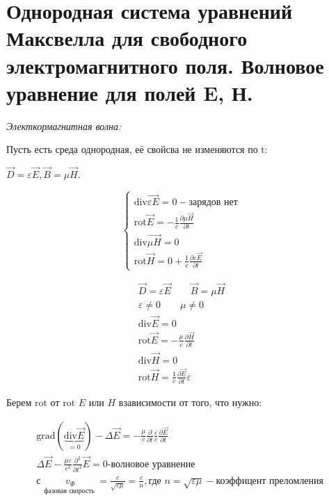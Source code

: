 \section{Однородная система уравнений Максвелла для свободного
электромагнитного поля. Волновое уравнение для полей E, Н.}

\textit{Электкормагнитная волна:}

Пусть есть среда однородная, её свойсва не изменяются по t: 

\( \vec{D}=\varepsilon\vec{E}, \vec{B}=\mu\vec{H} \).

\[
\begin{cases}
    \mathrm{div}\vec{\varepsilon E}=0 -\text{зарядов нет} \\
    \mathrm{rot}\vec{E}=-\frac{1}{c} \frac{\partial\mu\vec{H}}{\partial t} \\
    \mathrm{div}\vec{\mu H}=0 \\
    \mathrm{rot}\vec{H}=0+\frac{1}{c} \frac{\partial\varepsilon\vec{E}}{\partial t}  
\end{cases}
\]

\begin{gather*}
    \vec{D}=\varepsilon\vec{E} \qquad \vec{B}=\mu\vec{H} \\
    \varepsilon\neq0 \qquad \mu\neq0 \qquad \\
    \mathrm{div}\vec{E}=0 \\
    \mathrm{rot}\vec{E}=-\frac{\mu}{c} \frac{\partial\vec{H}}{\partial t} \\
    \mathrm{div}\vec{H}=0 \\
    \mathrm{rot}\vec{H}=\frac{1}{c} \frac{\partial\vec{E}}{\partial t} \varepsilon 
\end{gather*}

Берем \( \mathrm{rot}  \) от \( \mathrm{rot}  \) \( E \) или \( H \) взависимости от того, что нужно:

\begin{gather*}
    \mathrm{grad}(\underbrace{\mathrm{div}\vec{E} }_{=0})-\Delta\vec{E}=-\frac{\mu}{c}\frac{\partial}{\partial t} \frac{\varepsilon}{c}\frac{\partial\vec{E}}{\partial t} \\
    \Delta\vec{E}-\frac{\mu\varepsilon}{c^2}\frac{\partial^2}{\partial t^2}\vec{E}=0 \text{-волновое уравнение} \\
    \text{с } \underset{\text{фазовая скорость }}{v_{\Phi}}=\frac{c}{\sqrt{\varepsilon\mu}}=\frac{c}{n}, \text{где } n=\sqrt{\varepsilon\mu}-\text{коэффицент преломления }   
\end{gather*}

